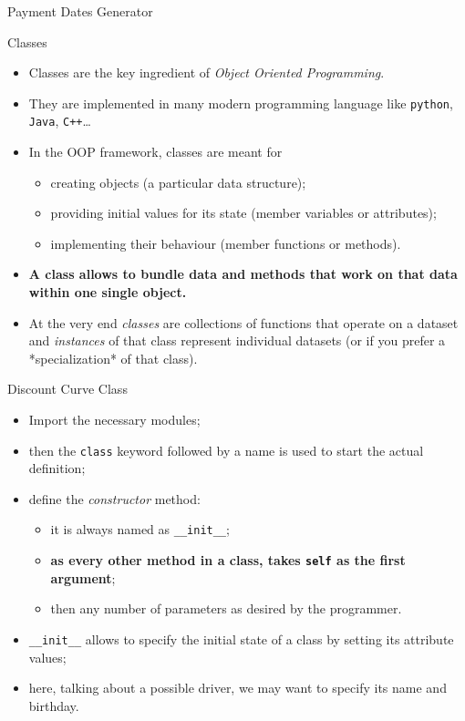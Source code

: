 \documentclass{beamer}
\begin{document}
\begin{frame}[fragile]{Payment Dates Generator}
\begin{itemize}
\begin{frame}{Classes}
  \begin{itemize}
    \item Classes are the key ingredient of \emph{Object Oriented Programming}.
    \item They are implemented in many modern programming language like \texttt{python}, \texttt{Java}, \texttt{C++}\ldots
    \item In the OOP framework, classes are meant for
      \begin{itemize}
        \item creating objects (a particular data structure);
        \item providing initial values for its state (member variables or attributes);
        \item implementing their behaviour (member functions or methods).
      \end{itemize}
    \item \textbf{A class allows to bundle data and methods that work on that data within one single object.}
    \item At the very end \emph{classes} are collections of functions that operate on a dataset and \emph{instances} of that class represent individual datasets (or if you prefer a *specialization* of that class).
  \end{itemize}
\end{frame}


\begin{frame}{Discount Curve Class}
  \begin{itemize}
    \item Import the necessary modules;
    \item then the \texttt{class} keyword followed by a name is used to start the actual definition;
    \item define the \emph{constructor} method:
      \begin{itemize}
        \item it is always named as \texttt{__init__};
        \item \textbf{as every other method in a class, takes \texttt{self} as the first argument};
        \item then any number of parameters as desired by the programmer.
      \end{itemize}
    \item \texttt{__init__} allows to specify the initial state of a class by setting its attribute values;
    \item here, talking about a possible driver, we may want to specify its name and birthday.
  \end{itemize}
\end{frame}


\end{itemize}
\end{frame}
\end{document}
